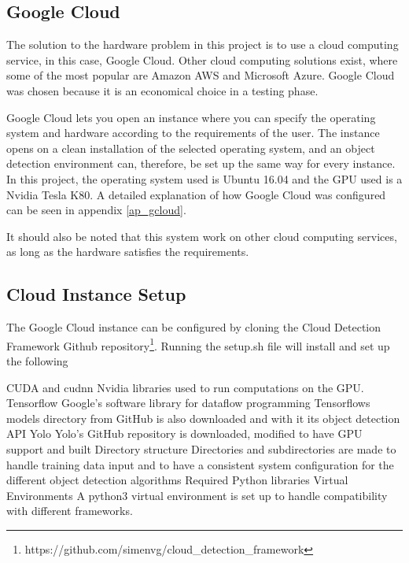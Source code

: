 \subsection{Google Cloud}
The solution to the hardware problem in this project is to use a cloud computing service, in this case, Google Cloud. Other cloud computing solutions exist, where some of the most popular are Amazon AWS and Microsoft Azure. Google Cloud was chosen because it is an economical choice in a testing phase.

\vspace{3mm}

\noindent
Google Cloud lets you open an instance where you can specify the operating system and hardware according to the requirements of the user. The instance opens on a clean installation of the selected operating system, and an object detection environment can, therefore, be set up the same way for every instance. In this project, the operating system used is Ubuntu 16.04 and the GPU used is a Nvidia Tesla K80. A detailed explanation of how Google Cloud was configured can be seen in appendix \ref{ap_gcloud}.

\vspace{3mm}

\noindent
It should also be noted that this system work on other cloud computing services, as long as the hardware satisfies the requirements. 

\subsection{Cloud Instance Setup}
The Google Cloud instance can be configured by cloning the Cloud Detection Framework Github repository\footnote{https://github.com/simenvg/cloud\_detection\_framework}. Running the setup.sh file will install and set up the following 

\begin{outline}
    \1 CUDA and cudnn
       \2 Nvidia libraries used to run computations on the GPU. 
    \1 Tensorflow
       \2 Google's software library for dataflow programming
       \2 Tensorflows models directory from GitHub is also downloaded and with it its object detection API
    \1 Yolo
       \2 Yolo's GitHub repository is downloaded, modified to have GPU support and built
    \1 Directory structure
       \2 Directories and subdirectories are made to handle training data input and to have a consistent system configuration for the different object detection algorithms
    \1 Required Python libraries
    \1 Virtual Environments
       \2 A python3 virtual environment is set up to handle compatibility with different frameworks.
\end{outline}



